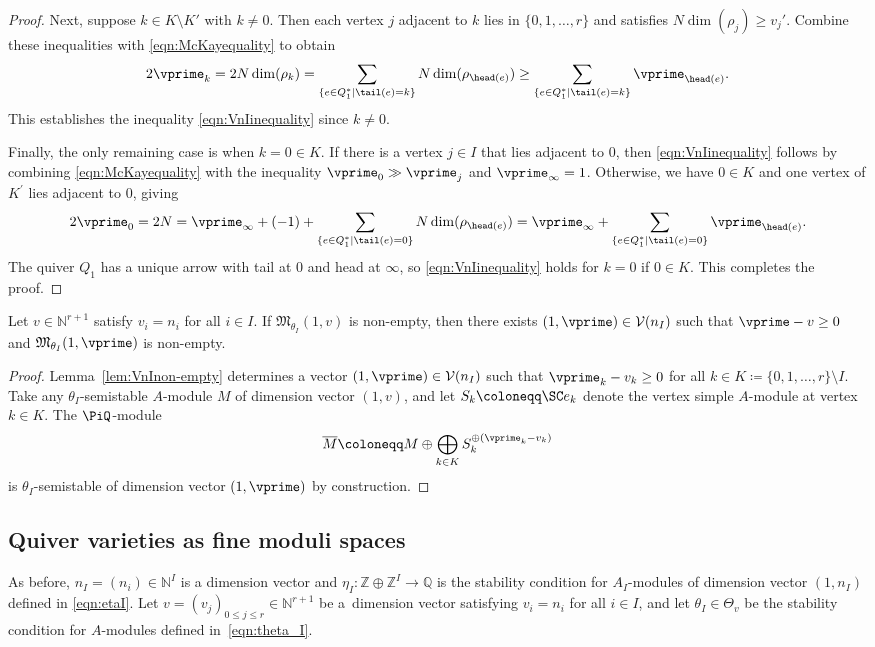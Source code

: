 \begin{proof}
 Next, suppose $k\in K\setminus K'$ with $k\neq 0$. Then each vertex $j$ adjacent to $k$ lies in $\{0,1,\dots,r\}$ and satisfies $N\dim(\rho_j)\geq v_j'$. Combine these inequalities with \eqref{eqn:McKayequality} to obtain
 \[
 2\vprime_k = 2N\dim(\rho_k) = \sum_{\{e\in Q_1^* \mid \tail(e)=k\}} N\dim(\rho_{\head(e)})
\geq \sum_{\{e\in Q_1^* \mid \tail(e)=k\}} \vprime_{\head(e)}.
\]
This establishes the inequality \eqref{eqn:VnIinequality} since $k\neq 0$.

 Finally, the only remaining case is when $k=0\in K$. If there is a vertex $j\in I$ that lies adjacent to $0$, then \eqref{eqn:VnIinequality} follows by combining \eqref{eqn:McKayequality} with the inequality $\vprime_0\gg \vprime_j$ and $\vprime_\infty = 1$. Otherwise, we have $0\in K$ and one vertex of $K^\prime$ lies adjacent to $0$, giving
 \[
 2\vprime_0 = 2N = \vprime_
\infty + (-1) + \sum_{\{e\in Q_1^* \mid \tail(e)=0\}} N \dim(\rho_{\head(e)}) = \vprime_\infty + \sum_{\{e\in Q_1^*\mid \tail(e)=0\}} \vprime_{\head(e)}.
 \]
 The quiver $Q_1$ has a unique arrow with tail at $0$ and head at $\infty$, so \eqref{eqn:VnIinequality} holds for $k=0$ if $0\in K$.
 This completes the proof.
 \end{proof}


 \begin{Corollary}
 \label{cor:non-empty}
 Let $v\in \mathbb{N}^{r+1}$ satisfy $v_i=n_i$ for all $i\in I$.
 If $\mathfrak{M}_{\theta_I}(1,v)$ is non-empty, then there exists $(1,\vprime)\in \mathcal{V}(n_I)$ such that $\vprime-v \geq 0$ and $\mathfrak{M}_{\theta_I}(1,\vprime)$ is non-empty.
 \end{Corollary}
 \begin{proof}
Lemma~\ref{lem:VnInon-empty} determines a vector $(1,\vprime)\in \mathcal{V}(n_I)$ such that
 $\vprime_k-v_k\geq 0$ for all $k\in K\coloneqq\{0,1,\dots,r\}\setminus I$. Take any $\theta_I$-semistable $A$-module $M$ of dimension vector $(1,v)$, and let $S_k\coloneqq\SC e_k$ denote the vertex simple $A$-module at vertex $k\in K$.
 The $\PiQ$-module
 \[
 \overline{M}\coloneqq M\oplus \bigoplus_{k\in K}
 S_k^{\oplus (\vprime_k-v_k)}
 \]
 is $\theta_I$-semistable of dimension vector $(1,\vprime)$ by construction.
 \end{proof}

\subsection{Quiver varieties as fine moduli spaces}
As before, $n_I=(n_i)\in \mathbb{N}^I$ is a dimension vector and $\eta_I\colon \mathbb{Z}\oplus \mathbb{Z}^I\to \mathbb{Q}$ is the stability condition for $A_I$-modules of dimension vector $(1,n_I)$ defined in \eqref{eqn:etaI}. Let $v=(v_j)_{0\leq j\leq r}\in \mathbb{N}^{r+1}$ be a~dimension vector satisfying $v_i=n_i$ for all $i\in I$, and let $\theta_I\in \Theta_v$ be the stability condition for $A$-modules defined in~\eqref{eqn:theta_I}.

